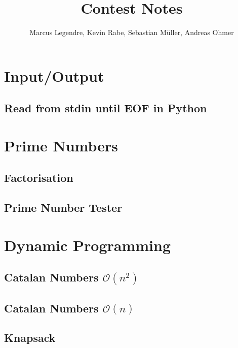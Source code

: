 \documentclass[11pt]{article}
\title{Contest Notes}
\author{Marcus Legendre, Kevin Rabe, Sebastian Müller, Andreas Ohmer}
\date{}
\begin{document}
\maketitle

\tableofcontents


\section{Input/Output}

\subsection{Read from stdin until EOF in Python}



\section{Prime Numbers}

\subsection{Factorisation}


\subsection{Prime Number Tester}



\section{Dynamic Programming}

\subsection{Catalan Numbers $\mathcal{O}(n^2)$}


\subsection{Catalan Numbers $\mathcal{O}(n)$}


\subsection{Knapsack}

\end{document}
